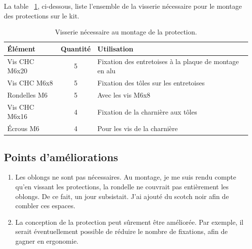 \begin{minipage}{\textwidth}
    La table ~\ref{tab:visserie_protection}, ci-dessous, liste l'ensemble de la visserie nécessaire pour le montage des protections sur le kit.



    \begin{table}[H]
        \centering
        \renewcommand{\arraystretch}{1.3}
        \begin{tabular}{|l|c|l|}
            \hline
            \textbf{Élément} & \textbf{Quantité} & \textbf{Utilisation}                                   \\
            \hline
            Vis CHC M6x20    & 5                 & Fixation des entretoises à la plaque de montage en alu \\
            Vis CHC M6x8     & 5                 & Fixation des tôles sur les entretoises                 \\
            Rondelles M6     & 5                 & Avec les vis M6x8                                      \\
            Vis CHC M6x16    & 4                 & Fixation de la charnière aux tôles                     \\
            Écrous M6        & 4                 & Pour les vis de la charnière                           \\
            \hline
        \end{tabular}
        \caption{Visserie nécessaire au montage de la protection. \cite{chatgptTableProtectionEntreeLaserVisserie}}
        \label{tab:visserie_protection}
    \end{table}
\end{minipage}
\subsection{Points d'améliorations}
\begin{enumerate}
    \item Les oblongs ne sont pas nécessaires. Au montage, je me suis rendu compte qu'en vissant les protections, la rondelle ne couvrait pas entièrement les oblongs. De ce fait, un jour subsistait. J'ai ajouté du scotch noir afin de combler ces espaces.
    \item La conception de la protection peut sûrement être améliorée. Par exemple, il serait éventuellement possible de réduire le nombre de fixations, afin de gagner en ergonomie.
\end{enumerate}
\clearpage